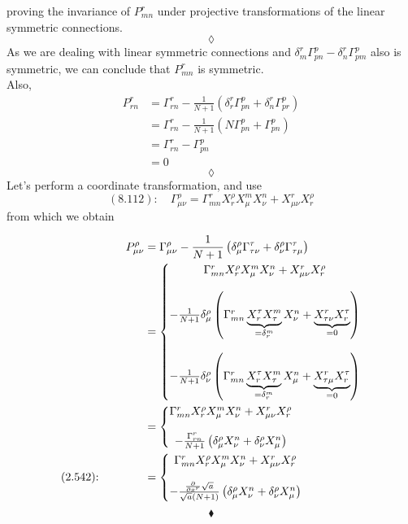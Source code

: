 proving the invariance of $P^{r}_{mn}$ under projective transformations of the linear symmetric connections.
$$\lozenge$$
As we are dealing with linear symmetric connections and $\delta^r_m \Gamma^{p}_{pn}-  \delta^r_n \Gamma^{p}_{pm} $ also is symmetric, we can conclude that $P^{r}_{mn}$ is symmetric. \\
Also,
\begin{align}
P^{r}_{rn} &= \Gamma ^{r}_{rn}-\frac{1}{N+1}\left(\delta^r_r \Gamma^p_{pn}+  \delta^r_n \Gamma^p_{pr} \right)\\
&= \Gamma ^{r}_{rn}-\frac{1}{N+1}\left(N \Gamma^p_{pn}+  \Gamma^p_{pn} \right)\\
&= \Gamma ^{r}_{rn}-\Gamma^p_{pn}\\
&=0
\end{align}
$$\lozenge$$
Let's perform a coordinate transformation, and use $$\mathbf{(8.112)}: \quad \Gamma^{\rho}_{\mu\nu} = \Gamma^{r}_{mn}X^{\rho}_{r}X^{m}_{\mu}X^{n}_{\nu}+ X^{r}_{\mu\nu}X^{\rho}_{r}$$ from which we obtain

\begin{align}
P^{\rho}_{\mu\nu} &= \Gamma^{\rho}_{\mu\nu}-\frac{1}{N+1}\left(\delta^{\rho}_{\mu} \Gamma^{\tau}_{\tau \nu}+  \delta^{\rho}_{\nu} \Gamma^{\tau}_{\tau \mu} \right)\\
&= \left\{\begin{matrix}\Gamma^{r}_{mn}X^{\rho}_{r}X^{m}_{\mu}X^{n}_{\nu}+ X^{r}_{\mu\nu}X^{\rho}_{r}\\\\
-\frac{1}{N+1}\delta^{\rho}_{\mu} \left(\Gamma^{r}_{mn}\underbrace{X^{\tau}_{r}X^{m}_{\tau}}_{=\delta^m_r}X^{n}_{\nu}+ \underbrace{X^{r}_{\tau\nu}X^{\tau}_{r}}_{=0}\right)\\\\
-\frac{1}{N+1} \delta^{\rho}_{\nu} \left(\Gamma^{r}_{mn}\underbrace{X^{\tau}_{r}X^{m}_{\tau}}_{=\delta^m_r}X^{n}_{\mu}+\underbrace{ X^{r}_{\tau\mu}X^{\tau}_{r}}_{=0}\right)
\end{matrix}\right.\\
&= \left\{\begin{matrix}\Gamma^{r}_{mn}X^{\rho}_{r}X^{m}_{\mu}X^{n}_{\nu}+ X^{r}_{\mu\nu}X^{\rho}_{r}\\\\
-\frac{\Gamma^{r}_{rn}}{N+1}\left(\delta^{\rho}_{\mu} X^{n}_{\nu}
+\delta^{\rho}_{\nu}X^{n}_{\mu}\right)
\end{matrix}\right.\\
\text{(2.542):}\quad\quad\quad\quad&= \left\{\begin{matrix}\Gamma^{r}_{mn}X^{\rho}_{r}X^{m}_{\mu}X^{n}_{\nu}+ X^{r}_{\mu\nu}X^{\rho}_{r}\\\\
-\frac{\pdv{}{x^r}\sqrt{a}}{\sqrt{a}(N+1)}\left(\delta^{\rho}_{\mu} X^{n}_{\nu}
+\delta^{\rho}_{\nu}X^{n}_{\mu}\right)
\end{matrix}\right.
\end{align}
$$\blacklozenge$$
\newpage



